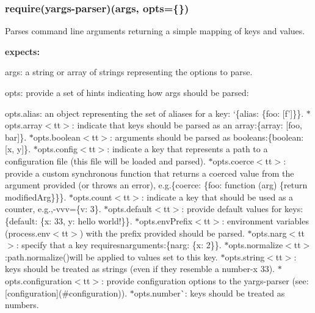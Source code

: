 \subsubsection*{require(\textquotesingle{}yargs-\/parser\textquotesingle{})(args, opts=\{\})}

Parses command line arguments returning a simple mapping of keys and values.

{\bfseries expects\+:}


\begin{DoxyItemize}
\item {\ttfamily args}\+: a string or array of strings representing the options to parse.
\item {\ttfamily opts}\+: provide a set of hints indicating how {\ttfamily args} should be parsed\+:
\begin{DoxyItemize}
\item {\ttfamily opts.\+alias}\+: an object representing the set of aliases for a key\+: `\{alias\+: \{foo\+: \mbox{[}\textquotesingle{}f'\mbox{]}\}\}{\ttfamily . $\ast$}opts.\+array$<$tt$>$\+: indicate that keys should be parsed as an array\+:\{array\+: \mbox{[}\textquotesingle{}foo\textquotesingle{}, \textquotesingle{}bar\textquotesingle{}\mbox{]}\}{\ttfamily . $\ast$}opts.\+boolean$<$tt$>$\+: arguments should be parsed as booleans\+:\{boolean\+: \mbox{[}\textquotesingle{}x\textquotesingle{}, \textquotesingle{}y\textquotesingle{}\mbox{]}\}{\ttfamily . $\ast$}opts.\+config$<$tt$>$\+: indicate a key that represents a path to a configuration file (this file will be loaded and parsed). $\ast$opts.\+coerce$<$tt$>$\+: provide a custom synchronous function that returns a coerced value from the argument provided (or throws an error), e.\+g.\{coerce\+: \{foo\+: function (arg) \{return modified\+Arg\}\}\}{\ttfamily . $\ast$}opts.\+count$<$tt$>$\+: indicate a key that should be used as a counter, e.\+g.,-\/vvv{\ttfamily =}\{v\+: 3\}{\ttfamily . $\ast$}opts.\+default$<$tt$>$\+: provide default values for keys\+:\{default\+: \{x\+: 33, y\+: \textquotesingle{}hello world!\textquotesingle{}\}\}{\ttfamily . $\ast$}opts.\+env\+Prefix$<$tt$>$\+: environment variables (process.\+env$<$tt$>$) with the prefix provided should be parsed. $\ast$opts.\+narg$<$tt$>$\+: specify that a key requiresn{\ttfamily arguments\+:}\{narg\+: \{x\+: 2\}\}{\ttfamily . $\ast$}opts.\+normalize$<$tt$>$\+:path.\+normalize(){\ttfamily will be applied to values set to this key. $\ast$}opts.\+string$<$tt$>$\+: keys should be treated as strings (even if they resemble a number-\/x 33{\ttfamily ). $\ast$}opts.\+configuration$<$tt$>$\+: provide configuration options to the yargs-\/parser (see\+: \mbox{[}configuration\mbox{]}(\#configuration)). $\ast$opts.\+number\`{}\+: keys should be treated as numbers.
\end{DoxyItemize}
\end{DoxyItemize}

